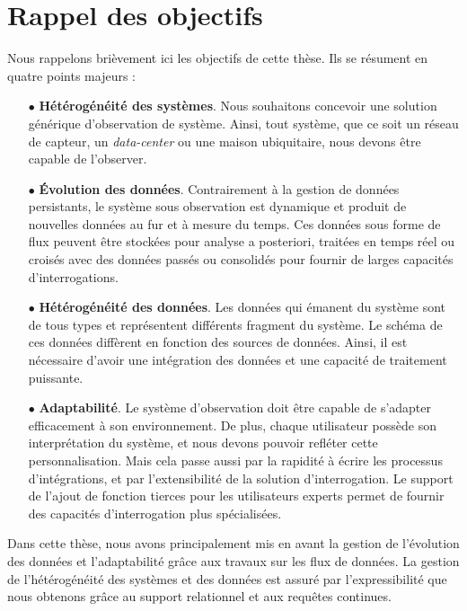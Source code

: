 \section{Rappel des objectifs}\label{sec:conclusion:objectifs}
Nous rappelons brièvement ici les objectifs de cette thèse. Ils se résument en quatre points majeurs :
\begin{itemize}
	\item[$\bullet$] \textbf{Hétérogénéité des systèmes}. Nous souhaitons concevoir une solution générique d'observation de système. Ainsi, tout système, que ce soit un réseau de capteur, un \textit{data-center} ou une maison ubiquitaire, nous devons être capable de l'observer.
	\item[$\bullet$] \textbf{Évolution des données}. Contrairement à la gestion de données persistants, le système sous observation est dynamique et produit de nouvelles données au fur et à mesure du temps. Ces données sous forme de flux peuvent être stockées pour analyse a posteriori, traitées en temps réel ou croisés avec des données passés ou consolidés pour fournir de larges capacités d'interrogations.
	\item[$\bullet$] \textbf{Hétérogénéité des données}. Les données qui émanent du système sont de tous types et représentent différents fragment du système. Le schéma de ces données diffèrent en fonction des sources de données. Ainsi, il est nécessaire d'avoir une intégration des données et une capacité de traitement puissante.
	\item[$\bullet$] \textbf{Adaptabilité}. Le système d'observation doit être capable de s'adapter efficacement à son environnement. De plus, chaque utilisateur possède son interprétation du système, et nous devons pouvoir refléter cette personnalisation. Mais cela passe aussi par la rapidité à écrire les processus d'intégrations, et par l'extensibilité de la solution d'interrogation. Le support de l'ajout de fonction tierces pour les utilisateurs experts permet de fournir des capacités d'interrogation plus spécialisées.
\end{itemize}

Dans cette thèse, nous avons principalement mis en avant la gestion de l'évolution des données et l'adaptabilité grâce aux travaux sur les flux de données. La gestion de l'hétérogénéité des systèmes et des données est assuré par l'expressibilité que nous obtenons grâce au support relationnel et aux requêtes continues.